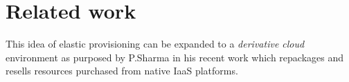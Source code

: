 
\chapter{Related work}
  
  

  This idea of elastic provisioning can be expanded to a \textit{derivative cloud} environment as purposed by P.Sharma in his recent work 
\cite{sharma2015spotcheck} which repackages and resells resources purchased from native IaaS platforms.
  
